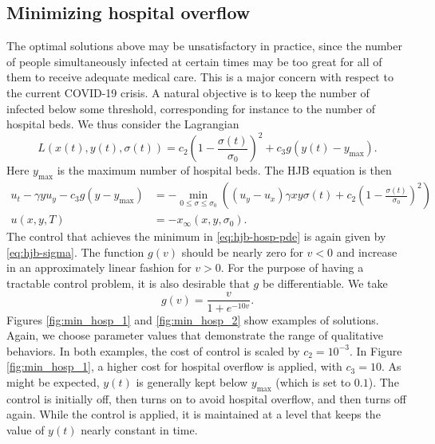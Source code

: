\documentclass[english,12pt,letter]{article}
\newcommand{\Rnot}{\sigma_0}
\newcommand{\Sinf}{x_\infty}
\newcommand{\ymax}{y_\text{max}}
\begin{document}
\subsection{Minimizing hospital overflow}
The optimal solutions above may be unsatisfactory in practice,
since the number of people simultaneously infected at certain times
may be too great for all of them to receive adequate medical care.  This is a major concern
with respect to the current COVID-19 crisis.  A natural objective is to keep
the number of infected below some threshold, corresponding for instance to the
number of hospital beds.  We thus consider the Lagrangian
$$
    L(x(t),y(t),\sigma(t)) = c_2 \left(1-\frac{\sigma(t)}{\Rnot}\right)^2 + c_3 g(y(t)-y_\text{max}).
$$
Here $\ymax$ is the maximum number of hospital beds.
The HJB equation is then
\begin{subequations} \label{eq:hjb-hosp}
\begin{align} \label{eq:hjb-hosp-pde}
    u_t - \gamma y u_y - c_3 g(y-y_\text{max}) & = - \min_{0\le \sigma\le \Rnot} \left((u_y-u_x)\gamma x y \sigma(t) + c_2 \left(1-\frac{\sigma(t)}{\Rnot}\right)^2 \right) \\
    u(x,y,T) & = -\Sinf(x,y,\Rnot).
\end{align}
\end{subequations}
The control that achieves the minimum in \eqref{eq:hjb-hosp-pde} is again given by \eqref{eq:hjb-sigma}.
The function $g(v)$ should be nearly zero for $v<0$ and increase
in an approximately linear fashion for $v>0$.  For the purpose of having
a tractable control problem, it is also desirable that $g$ be differentiable.
We take
$$
g(v) = \frac{v}{1+e^{-10v}}.
$$
Figures \ref{fig:min_hosp_1} and \ref{fig:min_hosp_2} show examples of solutions.
Again, we choose parameter values that demonstrate the range of qualitative behaviors.
In both examples, the cost of control is scaled by $c_2=10^{-3}$.
In Figure \ref{fig:min_hosp_1}, a higher cost for hospital overflow is applied,
with $c_3=10$.  As might be expected, $y(t)$ is generally
kept below $\ymax$ (which is set to $0.1$).
The control is initially off, then turns on
to avoid hospital overflow, and then turns off again.  While the control is applied,
it is maintained at a level that keeps the value of $y(t)$ nearly constant in time.
\end{document}
